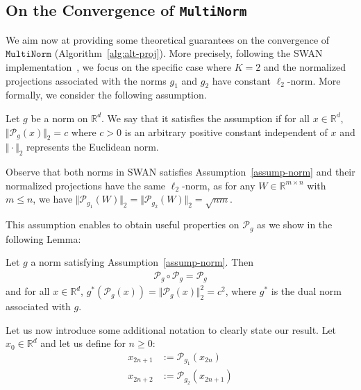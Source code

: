 \subsection{On the Convergence of \texttt{MultiNorm}}
We aim now at providing some theoretical guarantees on the convergence of  $\texttt{MultiNorm}$ (Algorithm~\ref{alg:alt-proj}). More precisely, following the SWAN implementation~\cite{ma2024swansgdnormalizationwhitening}, we focus on the specific case where $K=2$ and the normalized projections associated with the norms $g_1$ and $g_2$ have constant $\ell_2$-norm. More formally, we consider the following assumption.
\begin{assumption}
\label{assump-norm}
Let $g$ be a norm on $\mathbb{R}^d$. We say that it satisfies the assumption if for all $x\in\mathbb{R}^d$, $\Vert \mathcal{P}_{g}(x) \Vert_2 = c $ where $c>0$ is an arbitrary positive constant independent of $x$ and $\Vert\cdot\Vert_2$ represents the Euclidean norm.
\end{assumption}

\begin{remark}
Observe that both norms in SWAN satisfies Assumption~\ref{assump-norm} and their normalized projections have the same $\ell_2$-norm, as for any $W\in\mathbb{R}^{m\times n}$ with $m\leq n$, we have $\Vert \mathcal{P}_{g_1}(W) \Vert_2 = \Vert \mathcal{P}_{g_2}(W)\Vert_2 = \sqrt{nm}$.
\end{remark}


This assumption enables to obtain useful properties on $\mathcal{P}_{g}$ as we show in the following Lemma:
\begin{lemma}
\label{lem:properties-proj}
Let $g$ a norm satisfying Assumption~\ref{assump-norm}. Then
\begin{align*}
    \mathcal{P}_{g}\circ\mathcal{P}_{g} =\mathcal{P}_{g}
\end{align*}
and for all $x\in\mathbb{R}^d$, $g^*(\mathcal{P}_g(x))=\Vert \mathcal{P}_g(x)\Vert_2^2=c^2$, 
where $g^*$ is the dual norm associated with $g$.
\end{lemma}

Let us now introduce some additional notation to clearly state our result. Let $x_0\in\mathbb{R}^d$ and let us define for $n\geq 0$:
\begin{equation}
\begin{aligned}
\label{eq:seq}
    x_{2n+1}&:=\mathcal{P}_{g_1}(x_{2n})\\
    x_{2n+2}&:= \mathcal{P}_{g_2}(x_{2n+1})
    \end{aligned}
\end{equation}

